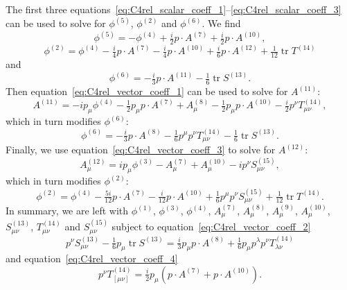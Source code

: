 \documentclass[11pt,reqno,a4paper,final]{amsart}
\theoremstyle{plain}
\theoremstyle{definition}
\newcommand{\phisup}[1]{\phi^{(#1)}}
\newcommand{\Asup}[1]{A^{(#1)}}
\newcommand{\Tsup}[1]{T^{(#1)}}
\newcommand{\Ssup}[1]{S^{(#1)}}
\newcommand{\tr}{\operatorname{tr}}
\newcommand{\1}{\mathbb{1}}
\numberwithin{equation}{section}
\begin{document}
\begin{appendices}
The first three
equations~\eqref{eq:C4rel_scalar_coeff_1}--\eqref{eq:C4rel_scalar_coeff_3}
can be used to solve for $\phisup{5}$, $\phisup{2}$ and $\phisup{6}$.
We find \begin{equation}
  \boxed{\phisup{5} = - \phisup{4} + \tfrac i2 p \cdot \Asup{7} + \tfrac i2 p \cdot \Asup{10}},
\end{equation}
\begin{equation}
  \phisup{2} = \phisup{4} - \tfrac i4 p \cdot \Asup{7} - \tfrac i4 p \cdot \Asup{10} + \tfrac i6 p \cdot \Asup{12} + \tfrac1{12} \tr \Tsup{14}
\end{equation}
and
\begin{equation}
  \phisup{6} = - \tfrac i3 p \cdot \Asup{11} - \tfrac 16 \tr \Ssup{13}.
\end{equation}
Then equation~\eqref{eq:C4rel_vector_coeff_1} can be used to solve for $\Asup{11}$:
\begin{equation}
  \boxed{\Asup{11} = -i p_\mu \phisup{4} - \tfrac12 p_\mu p \cdot \Asup{7} + \Asup{8}_\mu - \tfrac12 p_\mu p \cdot \Asup{10} - \tfrac i2 p^\nu \Tsup{14}_{\mu\nu}},
\end{equation}
which in turn modifies $\phisup{6}$:
\begin{equation}
  \boxed{\phisup{6} = - \tfrac i3 p \cdot \Asup{8} - \tfrac 16 p^\mu p^\nu \Tsup{14}_{\mu\nu} - \tfrac 16 \tr \Ssup{13}}.
\end{equation}
Finally, we use equation~\eqref{eq:C4rel_vector_coeff_3} to solve for $\Asup{12}$:
\begin{equation}
  \boxed{\Asup{12}_\mu = i p_\mu \phisup{3} - \Asup{7}_\mu + \Asup{10}_\mu - i p^\nu \Ssup{15}_{\mu\nu}},
\end{equation}
which in turn modifies $\phisup{2}$:
\begin{equation}
  \boxed{\phisup{2} = \phisup{4} - \tfrac{5i}{12} p \cdot \Asup{7} - \tfrac i{12} p \cdot \Asup{10} + \tfrac 16 p^\mu p^\nu \Ssup{15}_{\mu\nu} + \tfrac1{12} \tr \Tsup{14}}.
\end{equation}
In summary, we are left with $\phisup{1}$, $\phisup{3}$, $\phisup{4}$, $\Asup{7}_\mu$, $\Asup{8}_\mu$, $\Asup{9}_\mu$, $\Asup{10}_\mu$, $\Ssup{13}_{\mu\nu}$, $\Tsup{14}_{\mu\nu}$ and $\Ssup{15}_{\mu\nu}$ subject to equation~\eqref{eq:C4rel_vector_coeff_2}
\begin{equation}
  \label{eq:S13-3-cocycle-condition}
  \boxed{p^\nu \Ssup{13}_{\mu\nu} - \tfrac16 p_\mu \tr \Ssup{13} = \tfrac i3 p_\mu p \cdot \Asup{8}+ \tfrac 16 p_\mu p^\lambda p^\nu \Tsup{14}_{\lambda\nu}}
\end{equation}
and equation~\eqref{eq:C4rel_vector_coeff_4}
\begin{equation}
  \label{eq:T14-3-cocycle-condition}
  \boxed{p^\nu \Tsup{14}_{[\mu\nu]} = \tfrac i2 p_\mu \left( p \cdot \Asup{7} + p \cdot \Asup{10} \right)}.
\end{equation}


\end{appendices}
\end{document}
